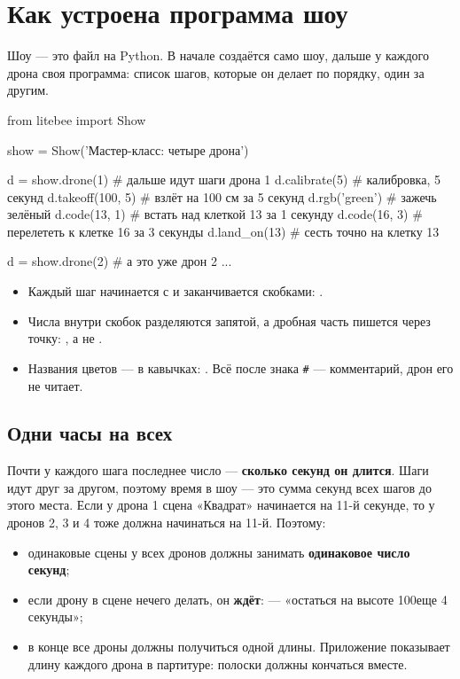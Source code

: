 \documentclass[a4paper,11pt]{scrartcl}
\begin{document}
\section{Как устроена программа шоу}

Шоу — это файл на Python. В начале создаётся само шоу, дальше у каждого дрона своя программа: список шагов, которые он делает по порядку, один за другим.

\begin{kod*}
from litebee import Show

show = Show('Мастер-класс: четыре дрона')

d = show.drone(1)      # дальше идут шаги дрона 1
d.calibrate(5)         # калибровка, 5 секунд
d.takeoff(100, 5)      # взлёт на 100 см за 5 секунд
d.rgb('green')         # зажечь зелёный
d.code(13, 1)          # встать над клеткой 13 за 1 секунду
d.code(16, 3)          # перелететь к клетке 16 за 3 секунды
d.land_on(13)          # сесть точно на клетку 13

d = show.drone(2)      # а это уже дрон 2
...
\end{kod*}

\begin{zametka}
\begin{itemize}
  \item Каждый шаг начинается с  и заканчивается скобками: .
  \item Числа внутри скобок разделяются запятой, а дробная часть пишется через точку: , а не .
  \item Названия цветов — в кавычках: . Всё после знака \texttt{\#} — комментарий, дрон его не читает.
\end{itemize}
\end{zametka}

\subsection*{Одни часы на всех}

Почти у каждого шага последнее число — \textbf{сколько секунд он длится}. Шаги идут друг за другом, поэтому время в шоу — это сумма секунд всех шагов до этого места. Если у дрона 1 сцена «Квадрат» начинается на 11-й секунде, то у дронов 2, 3 и 4 тоже должна начинаться на 11-й. Поэтому:

\begin{itemize}
  \item одинаковые сцены у всех дронов должны занимать \textbf{одинаковое число секунд};
  \item если дрону в сцене нечего делать, он \textbf{ждёт}:  — «остаться на высоте 100\cm еще 4 секунды»;
  \item в конце все дроны должны получиться одной длины. Приложение показывает длину каждого дрона в партитуре: полоски должны кончаться вместе.
\end{itemize}
\end{document}
